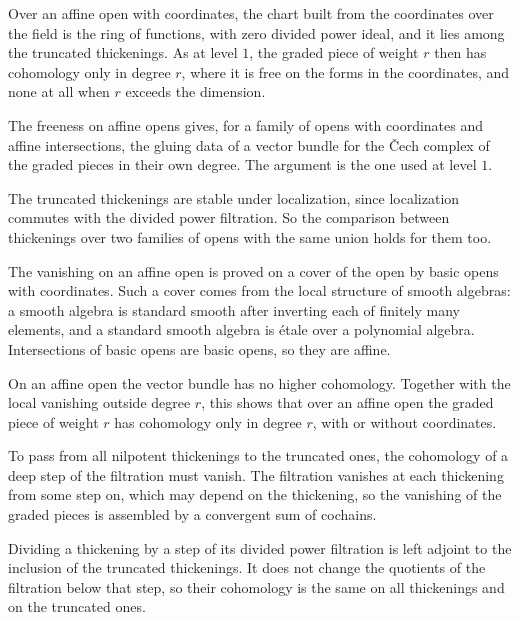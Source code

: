 Over an affine open with coordinates, the chart built from the coordinates over the field is the ring of functions, with
zero divided power ideal, and it lies among the truncated thickenings. As at level $1$, the graded piece of weight $r$ then has cohomology only in degree $r$, where it is
free on the forms in the coordinates, and none at all when $r$ exceeds the dimension.

The freeness on affine opens gives, for a family of opens with coordinates and affine intersections, the gluing data of a
vector bundle for the \v{C}ech complex of the graded pieces in their own degree. The argument is the one used at level
$1$.

The truncated thickenings are stable under localization, since localization commutes with the divided power filtration.
So the comparison between thickenings over two families of opens with the same union holds for them too.

The vanishing on an affine open is proved on a cover of the open by basic opens with coordinates. Such a cover comes from
the local structure of smooth algebras: a smooth algebra is standard smooth after inverting each of finitely many
elements, and a standard smooth algebra is \'etale over a polynomial algebra. Intersections of basic opens are basic opens,
so they are affine.

On an affine open the vector bundle has no higher cohomology. Together with the local vanishing outside degree $r$, this
shows that over an affine open the graded piece of weight $r$ has cohomology only in degree $r$, with or without
coordinates.

To pass from all nilpotent thickenings to the truncated ones, the cohomology of a deep step of the filtration must
vanish. The filtration vanishes at each thickening from some step on, which may depend on the thickening, so the
vanishing of the graded pieces is assembled by a convergent sum of cochains.

Dividing a thickening by a step of its divided power filtration is left adjoint to the inclusion of the truncated
thickenings. It does not change the quotients of the filtration below that step, so their cohomology is the same on all
thickenings and on the truncated ones.

